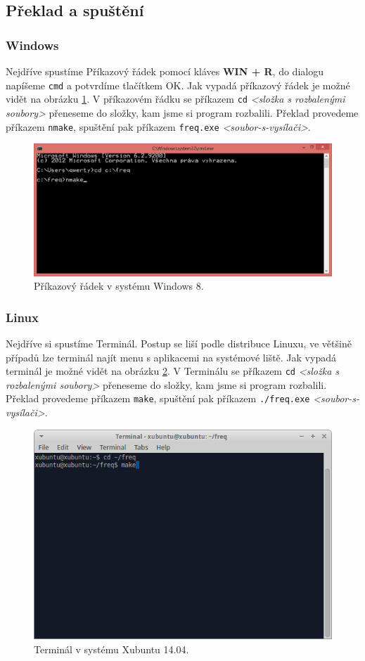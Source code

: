 \documentclass[12pt,a4paper]{article}
\begin{document}
\subsection{Překlad a spuštění}
\subsubsection{Windows}
%
Nejdříve spustíme Příkazový řádek pomocí kláves \textbf{WIN + R}, 
do dialogu napíšeme \texttt{cmd} a potvrdíme tlačítkem OK. Jak vypadá příkazový řádek 
je možné vidět na obrázku \ref{fig:windowscommand}. V příkazovém řádku se
příkazem \texttt{cd} \textit{<složka s rozbalenými soubory>} přeneseme do složky, kam jsme 
si program rozbalili. Překlad provedeme příkazem \texttt{nmake}, spuštění pak příkazem 
\texttt{freq.exe} \textit{<soubor-s-vysílači>}.

\begin{figure}[htbp]
  \centering
    \includegraphics[width=.90\textwidth]{pics/windows.png}
  \caption{Příkazový řádek v systému Windows 8.}
  \label{fig:windowscommand}
\end{figure}
%
\subsubsection{Linux}
%
Nejdříve si spustíme Terminál. Postup se liší podle distribuce Linuxu, ve většině
případů lze terminál najít menu s aplikacemi na systémové liště. Jak vypadá terminál 
je možné vidět na obrázku \ref{fig:linuxterminal}. V Terminálu se
příkazem \texttt{cd} \textit{<složka s rozbalenými soubory>} přeneseme do složky, kam jsme 
si program rozbalili. Překlad provedeme příkazem \texttt{make}, spuštění pak příkazem 
\texttt{./freq.exe} \textit{<soubor-s-vysílači>}.

\begin{figure}[htbp]
  \centering
    \includegraphics[width=.75\textwidth]{pics/linux.png}
  \caption{Terminál v systému Xubuntu 14.04.}
  \label{fig:linuxterminal}
\end{figure}
%
\newpage
\end{document}
